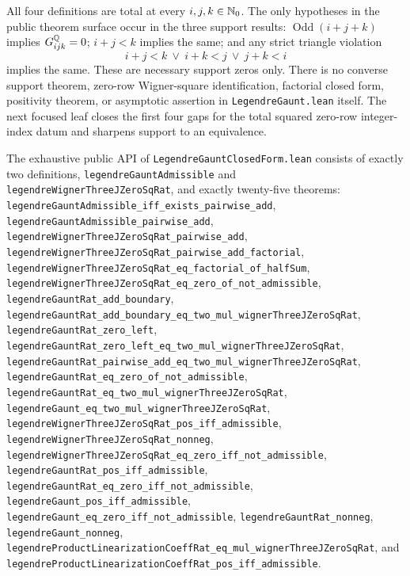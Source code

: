 \documentclass[11pt,oneside]{article}
\theoremstyle{definition}
\theoremstyle{remark}
\begin{document}
All four definitions are total at every \(i,j,k\in\mathbb{N}_{0}\).  The only
hypotheses in the public theorem surface occur in the three support results:
\(\operatorname{Odd}(i+j+k)\) implies \(G^{\mathbb{Q}}_{ijk}=0\);
\(i+j<k\) implies the same; and any strict triangle violation
\[
 i+j<k\ \lor\ i+k<j\ \lor\ j+k<i
\]
implies the same.  These are necessary support zeros only.  There is no converse
support theorem, zero-row Wigner-square identification, factorial closed form,
positivity theorem, or asymptotic assertion in \nolinkurl{LegendreGaunt.lean}
itself.  The next focused leaf closes the first four gaps for the total squared
zero-row integer-index datum and sharpens support to an equivalence.

The exhaustive public API of \nolinkurl{LegendreGauntClosedForm.lean} consists
of exactly two definitions, \nolinkurl{legendreGauntAdmissible} and
\nolinkurl{legendreWignerThreeJZeroSqRat}, and exactly twenty-five theorems:
\nolinkurl{legendreGauntAdmissible_iff_exists_pairwise_add},
\nolinkurl{legendreGauntAdmissible_pairwise_add},
\nolinkurl{legendreWignerThreeJZeroSqRat_pairwise_add},
\nolinkurl{legendreWignerThreeJZeroSqRat_pairwise_add_factorial},
\nolinkurl{legendreWignerThreeJZeroSqRat_eq_factorial_of_halfSum},
\nolinkurl{legendreWignerThreeJZeroSqRat_eq_zero_of_not_admissible},
\nolinkurl{legendreGauntRat_add_boundary},
\nolinkurl{legendreGauntRat_add_boundary_eq_two_mul_wignerThreeJZeroSqRat},
\nolinkurl{legendreGauntRat_zero_left},
\nolinkurl{legendreGauntRat_zero_left_eq_two_mul_wignerThreeJZeroSqRat},
\nolinkurl{legendreGauntRat_pairwise_add_eq_two_mul_wignerThreeJZeroSqRat},
\nolinkurl{legendreGauntRat_eq_zero_of_not_admissible},
\nolinkurl{legendreGauntRat_eq_two_mul_wignerThreeJZeroSqRat},
\nolinkurl{legendreGaunt_eq_two_mul_wignerThreeJZeroSqRat},
\nolinkurl{legendreWignerThreeJZeroSqRat_pos_iff_admissible},
\nolinkurl{legendreWignerThreeJZeroSqRat_nonneg},
\nolinkurl{legendreWignerThreeJZeroSqRat_eq_zero_iff_not_admissible},
\nolinkurl{legendreGauntRat_pos_iff_admissible},
\nolinkurl{legendreGauntRat_eq_zero_iff_not_admissible},
\nolinkurl{legendreGaunt_pos_iff_admissible},
\nolinkurl{legendreGaunt_eq_zero_iff_not_admissible},
\nolinkurl{legendreGauntRat_nonneg},
\nolinkurl{legendreGaunt_nonneg},
\nolinkurl{legendreProductLinearizationCoeffRat_eq_mul_wignerThreeJZeroSqRat}, and
\nolinkurl{legendreProductLinearizationCoeffRat_pos_iff_admissible}.
\end{document}
